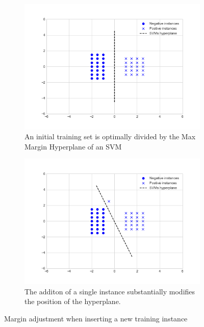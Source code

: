 \begin{figure}[H]
  \centering
  \begin{subfigure}{.5\textwidth}
    \centering
    \captionsetup{width=.95\linewidth}
    \includegraphics[width=.95\linewidth]{files/figures/method/soft_margin_normal}
    \caption{An initial training set is optimally divided by the Max Margin
    Hyperplane of an SVM}
    \label{fig:sub1}
  \end{subfigure}%
  \begin{subfigure}{.5\textwidth}
    \centering
    \captionsetup{width=.95\linewidth}
    \includegraphics[width=.95\linewidth]{files/figures/method/soft_margin_high_c}
    \caption{The additon of a single instance substantially modifies
    the position of the hyperplane.}
    \label{fig:sub2}
  \end{subfigure}
  \caption{Margin adjustment when inserting a new training instance}
  \label{fig:soft_margin_high_c}
\end{figure}

